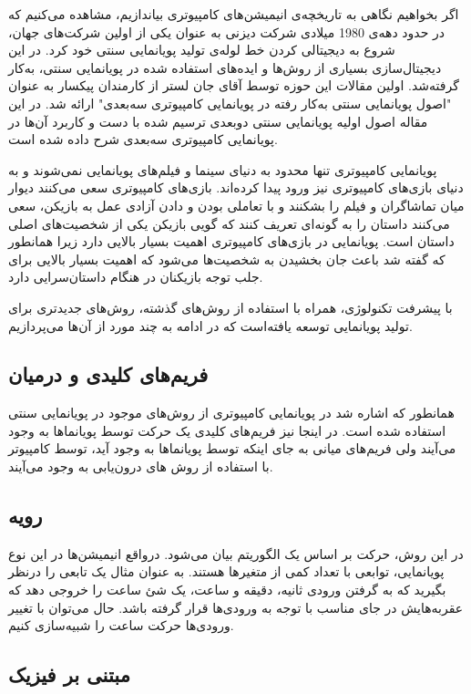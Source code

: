 اگر بخواهیم نگاهی به تاریخچه‌ی انیمیشن‌های کامپیوتری بیاندازیم، مشاهده می‌کنیم که 
در حدود دهه‌ی 1980 میلادی شرکت دیزنی به عنوان یکی از اولین شرکت‌های جهان، شروع به 
دیجیتالی کردن خط لوله‌ی تولید پویانمایی سنتی خود کرد.
در این دیجیتال‌سازی بسیاری از روش‌ها و ایده‌‌های استفاده شده در پویانمایی سنتی،
به‌کار گرفته‌شد.
اولین مقالات این حوزه توسط آقای جان لستر از کارمندان پیکسار به عنوان 
"اصول پویانمایی سنتی به‌کار رفته در پویانمایی کامپیوتری سه‌بعدی"
ارائه شد.
در این مقاله اصول اولیه پویانمایی سنتی دوبعدی ترسیم شده با دست
و کاربرد آن‌ها در پویانمایی کامپیوتری سه‌بعدی شرح داده شده است.

پویانمایی کامپیوتری تنها محدود به دنیای سینما و فیلم‌های پویانمایی نمی‌شوند و به دنیای
بازی‌های کامپیوتری نیز ورود پیدا کرده‌اند. بازی‌های کامپیوتری سعی می‌کنند دیوار میان تماشاگران و فیلم را بشکنند و 
با تعاملی بودن و دادن آزادی عمل به بازیکن، سعی می‌کنند داستان را به گونه‌ای تعریف کنند که گویی بازیکن یکی از شخصیت‌های اصلی داستان است.
پویانمایی در بازی‌های کامپیوتری اهمیت بسیار بالایی دارد زیرا همانطور که گفته شد باعث 
جان بخشیدن به شخصیت‌ها می‌شود که اهمیت بسیار بالایی برای جلب توجه بازیکنان در هنگام داستان‌سرایی دارد.

با پیشرفت تکنولوژی، همراه با استفاده از روش‌های گذشته، روش‌های جدیدتری برای تولید پویانمایی توسعه یافته‌است که 
در ادامه به چند مورد از آن‌‌ها می‌پردازیم.

\subsection{فریم‌های کلیدی و درمیان}

همانطور که اشاره شد در پویانمایی کامپیوتری از روش‌های موجود در 
پویانمایی سنتی استفاده شده است. در اینجا نیز فریم‌های کلیدی 
یک حرکت توسط پویانماها به وجود می‌‌آیند ولی فریم‌های میانی به جای اینکه توسط پویانماها به وجود آید،
توسط کامپیوتر با استفاده از روش های درون‌یابی به وجود می‌آیند.

\subsection{رویه}

در این روش، حرکت بر اساس یک الگوریتم بیان می‌شود.
درواقع انیمیشن‌ها در این نوع پویانمایی، توابعی با تعداد کمی از متغیر‌ها هستند.
به عنوان مثال یک تابعی را درنظر بگیرید که به گرفتن ورودی ثانیه، دقیقه و ساعت، 
یک شئ ساعت را خروجی دهد که عقربه‌هایش در جای مناسب با توجه به ورودی‌ها قرار گرفته باشد.
حال می‌توان با تغییر ورودی‌ها حرکت ساعت را شبیه‌سازی کنیم.

\subsection{مبتنی بر فیزیک}

